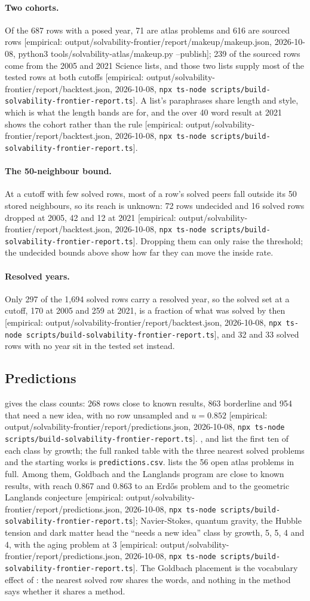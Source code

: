 \documentclass[11pt]{article}
\newcommand{\emp}[1]{\textcolor{bucketgray}{\footnotesize [empirical: #1]}}
\newcommand{\cmd}{\texttt{npx ts-node scripts/build-solvability-frontier-report.ts}}
\newcommand{\bt}{\emp{output/solvability-frontier/report/backtest.json, 2026-10-08, \cmd}}
\newcommand{\pr}{\emp{output/solvability-frontier/report/predictions.json, 2026-10-08, \cmd}}
\newcommand{\mk}{\emp{output/solvability-frontier/report/makeup/makeup.json, 2026-10-08, python3 tools/solvability-atlas/makeup.py --publish}}
\begin{document}
\paragraph{Two cohorts.}
Of the 687 rows with a posed year, 71 are atlas problems and 616 are sourced rows \mk; 239 of the sourced rows come from the 2005 and 2021 Science lists, and those two lists supply most of the tested rows at both cutoffs \bt. A list's paraphrases share length and style, which is what the length bands are for, and the over 40 word result at 2021 shows the cohort rather than the rule \bt.

\paragraph{The 50-neighbour bound.}
At a cutoff with few solved rows, most of a row's solved peers fall outside its 50 stored neighbours, so its reach is unknown: 72 rows undecided and 16 solved rows dropped at 2005, 42 and 12 at 2021 \bt. Dropping them can only raise the threshold; the undecided bounds above show how far they can move the inside rate.

\paragraph{Resolved years.}
Only 297 of the 1,694 solved rows carry a resolved year, so the solved set at a cutoff, 170 at 2005 and 259 at 2021, is a fraction of what was solved by then \bt, and 32 and 33 solved rows with no year sit in the tested set instead.

\subsection{Predictions}

 gives the class counts: 268 rows close to known results, 863 borderline and 954 that need a new idea, with no row unsampled and $u = 0.852$ \pr. ,  and  list the first ten of each class by growth; the full ranked table with the three nearest solved problems and the starting works is \texttt{predictions.csv}.  lists the 56 open atlas problems in full. Among them, Goldbach and the Langlands program are close to known results, with reach 0.867 and 0.863 to an Erdős problem and to the geometric Langlands conjecture \pr; Navier-Stokes, quantum gravity, the Hubble tension and dark matter head the \enquote{needs a new idea} class by growth, 5, 5, 4 and 4, with the aging problem at 3 \pr. The Goldbach placement is the vocabulary effect of : the nearest solved row shares the words, and nothing in the method says whether it shares a method.
\end{document}
